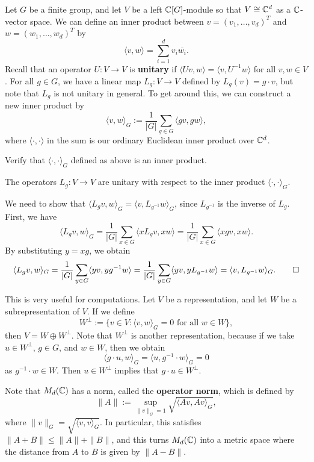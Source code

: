 Let $G$ be a finite group, and let $V$ be a left $\mathbb{C}[G]$-module so that 
$V \cong \mathbb{C}^d$ as a $\mathbb{C}$-vector space. We can define an inner product 
between $v = (v_1, \dots, v_d)^T$ and $w = (w_1, \dots, w_d)^T$ by 
\[ \langle v, w \rangle = \sum_{i=1}^d v_i \overline{w_i}. \] 
Recall that an operator $U : V \to V$ is \textbf{unitary} if 
$\langle Uv, w \rangle = \langle v, U^{-1}w \rangle$ for all $v, w \in V$. 
For all $g \in G$, we have a linear map $L_g : V \to V$ defined by 
$L_g(v) = g \cdot v$, but note that $L_g$ is not unitary in general. 
To get around this, we can construct a new inner product by 
\[ \langle v, w \rangle_G := \frac{1}{|G|} \sum_{g \in G} \langle gv, gw \rangle, \] 
where $\langle \cdot, \cdot \rangle$ in the sum is our ordinary Euclidean inner 
product over $\mathbb{C}^d$. 

\begin{exercise}{}
    Verify that $\langle \cdot, \cdot \rangle_G$ defined as above is an inner product. 
\end{exercise}

\begin{prop}{}
    The operators $L_g : V \to V$ are unitary with respect to the inner product 
    $\langle \cdot, \cdot \rangle_G$. 
\end{prop}
\begin{pf}
    We need to show that $\langle L_gv, w \rangle_G = \langle v, L_{g^{-1}}w \rangle_G$, 
    since $L_{g^{-1}}$ is the inverse of $L_g$. First, we have 
    \[ \langle L_gv, w \rangle_G = \frac{1}{|G|} \sum_{x\in G} \langle xL_g v, xw \rangle 
    = \frac{1}{|G|} \sum_{x\in G} \langle xgv, xw \rangle. \] 
    By substituting $y = xg$, we obtain 
    \[ \langle L_gv, w \rangle_G = \frac{1}{|G|} \sum_{y \in G} \langle yv, yg^{-1}w \rangle 
    = \frac{1}{|G|} \sum_{y\in G} \langle yv, yL_{g^{-1}}w \rangle = \langle v, L_{g^{-1}}w \rangle_G. 
    \qedhere \] 
\end{pf}
This is very useful for computations. Let $V$ be a representation, and let
$W$ be a subrepresentation of $V$. If we define 
\[ W^{\perp} := \{v \in V : \langle v, w \rangle_G = 0 \text{ for all } w \in W\}, \] 
then $V = W \oplus W^{\perp}$. Note that $W^{\perp}$ is another representation, 
because if we take $u \in W^{\perp}$, $g \in G$, and $w \in W$, then we obtain 
\[ \langle g \cdot u, w \rangle_G = \langle u, g^{-1} \cdot w \rangle_G = 0 \] 
as $g^{-1} \cdot w \in W$. Then $u \in W^{\perp}$ implies that $g \cdot u \in W^{\perp}$. 

Note that $M_d(\mathbb{C})$ has a norm, called the \textbf{operator norm}, which is defined by 
\[ \|A\| := \sup_{\|v\|_G = 1} \sqrt{\langle Av, Av \rangle_G}, \] 
where $\|v\|_G = \sqrt{\langle v, v \rangle_G}$. In particular, this 
satisfies $\|A + B\| \leq \|A\| + \|B\|$, and this turns $M_d(\mathbb{C})$ into 
a metric space where the distance from $A$ to $B$ is given by $\|A - B\|$. 

